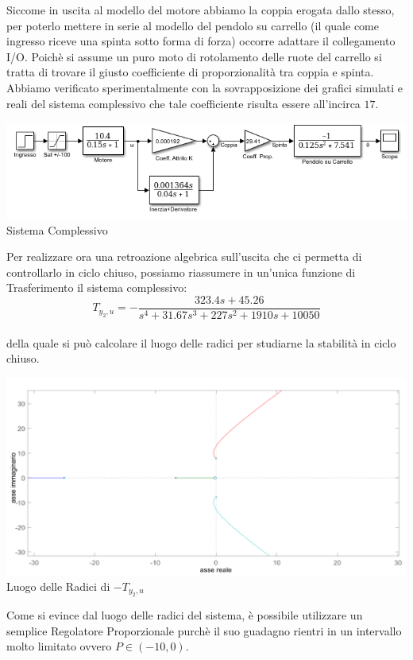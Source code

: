 Siccome in uscita al modello del motore abbiamo la coppia erogata dallo stesso, per poterlo mettere in serie al modello del pendolo su carrello (il quale come ingresso riceve una spinta sotto forma di forza) occorre adattare il collegamento I/O. Poichè si assume un puro moto di rotolamento delle ruote del carrello si tratta di trovare il giusto coefficiente di proporzionalità tra coppia e spinta.
Abbiamo verificato sperimentalmente con la sovrapposizione dei grafici simulati e reali del sistema complessivo che tale coefficiente risulta essere all'incirca $17$.\\
\begin{center}
	\includegraphics[scale=0.5]{SisComplessivoPendoloNormale.PNG}\\
	{\footnotesize  Sistema Complessivo}
\end{center}
Per realizzare ora una retroazione algebrica sull'uscita che ci permetta di controllarlo in ciclo chiuso, possiamo riassumere in un'unica funzione di Trasferimento il sistema complessivo:\\
$$T_{y_2,u}=-\displaystyle\frac{323.4s+45.26}{s^4+31.67s^3+227s^2+1910s+10050}$$\\
della quale si può calcolare il luogo delle radici per studiarne la stabilità in ciclo chiuso.
\begin{center}
	\includegraphics[scale=0.45]{RLocusPendoloNormale.PNG}\\
	{\footnotesize  Luogo delle Radici di $-T_{y_2,u}$}
\end{center}
Come si evince dal luogo delle radici del sistema, è possibile utilizzare un semplice Regolatore Proporzionale purchè il suo guadagno rientri in un intervallo molto limitato ovvero $P\in(-10,0)$.\\
